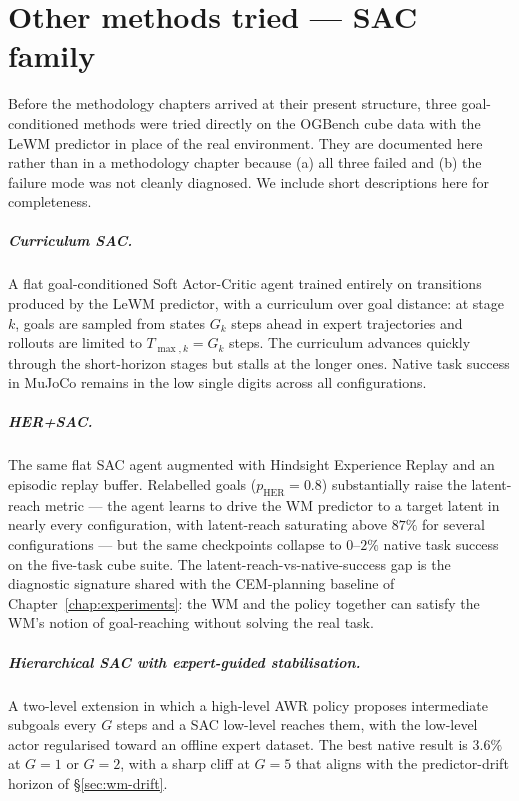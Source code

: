 \appendix
\chapter{Other methods tried --- SAC family}
\label{app:sac-retrospective}

Before the methodology chapters arrived at their present
structure, three goal-conditioned methods were tried directly on
the OGBench cube data with the LeWM predictor in place of the
real environment. They are documented here rather than in a
methodology chapter because (a) all three failed and (b) the
failure mode was not cleanly diagnosed. We include short descriptions here for completeness.

\paragraph{Curriculum SAC.}
A flat goal-conditioned Soft Actor-Critic agent
\cite{haarnoja2018softactorcriticoffpolicymaximum} trained
entirely on transitions produced by the LeWM predictor, with a
curriculum over goal distance: at stage $k$, goals are sampled
from states $G_k$ steps ahead in expert trajectories and rollouts
are limited to $T_{\max,k} = G_k$ steps. The curriculum advances
quickly through the short-horizon stages but stalls at the longer
ones. Native task success in MuJoCo remains in the low single
digits across all configurations.

\paragraph{HER+SAC.}
The same flat SAC agent augmented with Hindsight Experience
Replay \cite{her} and an episodic replay buffer. Relabelled goals
($p_{\text{HER}} = 0.8$) substantially raise the latent-reach
metric --- the agent learns to drive the WM predictor to a target
latent in nearly every configuration, with latent-reach
saturating above $87\%$ for several configurations --- but the
same checkpoints collapse to $0$--$2\%$ native task success on the
five-task cube suite. The latent-reach-vs-native-success gap is
the diagnostic signature shared with the CEM-planning baseline of
Chapter~\ref{chap:experiments}: the WM and the policy together
can satisfy the WM's notion of goal-reaching without solving the
real task.

\paragraph{Hierarchical SAC with expert-guided stabilisation.}
A two-level extension in which a high-level AWR policy proposes
intermediate subgoals every $G$ steps and a SAC low-level reaches
them, with the low-level actor regularised toward an offline
expert dataset. The best native result is $3.6\%$ at $G=1$ or
$G=2$, with a sharp cliff at $G=5$ that aligns with the
predictor-drift horizon of \S\ref{sec:wm-drift}.

